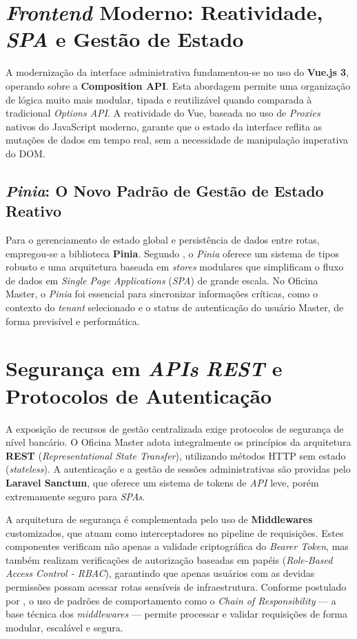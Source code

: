 \section{\textit{Frontend} Moderno: Reatividade, \textit{SPA} e Gestão de Estado}

A modernização da interface administrativa fundamentou-se no uso do \textbf{Vue.js 3}, operando sobre a \textbf{Composition API}. Esta abordagem permite uma organização de lógica muito mais modular, tipada e reutilizável quando comparada à tradicional \textit{Options API}. A reatividade do Vue, baseada no uso de \textit{Proxies} nativos do JavaScript moderno, garante que o estado da interface reflita as mutações de dados em tempo real, sem a necessidade de manipulação imperativa do DOM.

\subsection{\textit{Pinia}: O Novo Padrão de Gestão de Estado Reativo}

Para o gerenciamento de estado global e persistência de dados entre rotas, empregou-se a biblioteca \textbf{Pinia}. Segundo , o \textit{Pinia} oferece um sistema de tipos robusto e uma arquitetura baseada em \textit{stores} modulares que simplificam o fluxo de dados em \textit{Single Page Applications} (\textit{SPA}) de grande escala. No Oficina Master, o \textit{Pinia} foi essencial para sincronizar informações críticas, como o contexto do \textit{tenant} selecionado e o status de autenticação do usuário Master, de forma previsível e performática.

\section{Segurança em \textit{APIs} \textit{REST} e Protocolos de Autenticação}

A exposição de recursos de gestão centralizada exige protocolos de segurança de nível bancário. O Oficina Master adota integralmente os princípios da arquitetura \textbf{REST} (\textit{Representational State Transfer}), utilizando métodos HTTP sem estado (\textit{stateless}). A autenticação e a gestão de sessões administrativas são providas pelo \textbf{Laravel Sanctum}, que oferece um sistema de tokens de \textit{API} leve, porém extremamente seguro para \textit{SPAs}.

A arquitetura de segurança é complementada pelo uso de \textbf{Middlewares} customizados, que atuam como interceptadores no pipeline de requisições. Estes componentes verificam não apenas a validade criptográfica do \textit{Bearer Token}, mas também realizam verificações de autorização baseadas em papéis (\textit{Role-Based Access Control - RBAC}), garantindo que apenas usuários com as devidas permissões possam acessar rotas sensíveis de infraestrutura. Conforme postulado por , o uso de padrões de comportamento como o \textit{Chain of Responsibility} — a base técnica dos \textit{middlewares} — permite processar e validar requisições de forma modular, escalável e segura.
